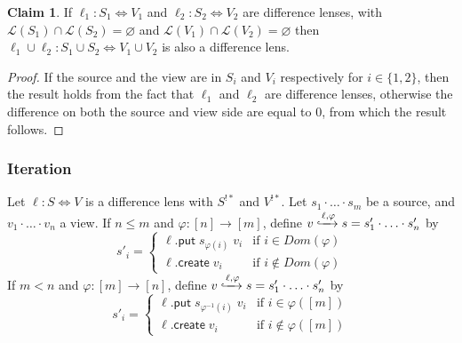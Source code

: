 \documentclass[acmsmall,review,anonymous]{acmart}\settopmatter{printfolios=true,printccs=false,printacmref=false}
\theoremstyle{definition}
\newtheorem{claim}{Claim}
\newcommand{\kw}[1]{\ensuremath{\mathsf{#1}}\xspace}
\newcommand{\pput}{\ensuremath{\kw{put}}\xspace}
\newcommand{\create}{\ensuremath{\kw{create}}\xspace}
\begin{document}
\begin{claim}
If $\ell_1 : S_1 \Leftrightarrow V_1$ and $\ell_2 : S_2 \Leftrightarrow V_2$ are difference lenses, with $\mathcal{L}(S_1) \cap \mathcal{L}(S_2) = \varnothing$ and $\mathcal{L}(V_1) \cap \mathcal{L}(V_2) = \varnothing$ then $\ell_1 \cup \ell_2 :
S_1 \cup S_2 \Leftrightarrow V_1 \cup V_2$ is also a difference lens.
\end{claim}
\begin{proof}
If the source and the view are in $S_i$ and $V_i$ respectively for $i \in \{1,2\}$, then the result holds from the fact that $\ell_1$ and $\ell_2$ are difference lenses, otherwise the difference on both the source and view side are equal to 0, from which the result follows.
\end{proof}
\subsubsection{Iteration}
Let $\ell : S \Leftrightarrow V$ is a difference lens with $S^{!*}$ and $V^{!*}$. Let $s_1 \cdot \ldots \cdot s_m$ be a source, and $v_1 \cdot \ldots \cdot v_n$ a view. If $n \leq m$ and $\varphi : [n] \longrightarrow [m]$, define $ v \xhookrightarrow{\ell, \varphi} s = s'_1 \cdot \ldots \cdot s'_n$ by 
$$s'_i = \begin{cases}
\ell.\pput \; s_{\varphi(i)} \; v_i & \text{if } i \in Dom(\varphi)\\
\ell.\create \; v_i & \text{if } i \not \in Dom(\varphi)
\end{cases}$$
If $m < n$ and $\varphi : [m] \longrightarrow [n]$, define $ v \xhookrightarrow{\ell, \varphi} s = s'_1 \cdot \ldots \cdot s'_n$ by 
$$s'_i = \begin{cases}
\ell.\pput \; s_{\varphi^{-1}(i)} \; v_i & \text{if } i \in \varphi([m])\\
\ell.\create \; v_i & \text{if } i \not \in \varphi([m])
\end{cases}$$
\end{document}

